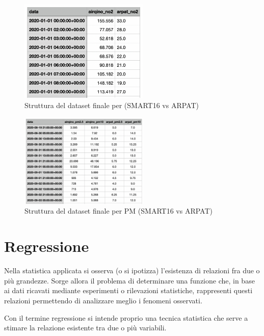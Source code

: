 \begin{figure}[H]
\centering
\captionsetup{justification=centering}
\includegraphics[width=0.55\textwidth,height=\textheight,keepaspectratio]{img/no2_ds_final}
\caption{Struttura del dataset finale per  (SMART16 vs ARPAT)}
\label{fig:no2-ds-final}
\end{figure}

\begin{figure}[H]
\centering
\captionsetup{justification=centering}
\includegraphics[width=0.55\textwidth,height=\textheight,keepaspectratio]{img/pm_ds_final}
\caption{Struttura del dataset finale per PM (SMART16 vs ARPAT)}
\label{fig:pm-ds-final}
\end{figure}

\section{Regressione}\label{sec:regressione}
Nella statistica applicata si osserva (o si ipotizza) l’esistenza di relazioni fra due o più grandezze. Sorge allora il problema di determinare una funzione che, in base ai dati ricavati mediante esperimenti o rilevazioni statistiche, rappresenti questi relazioni permettendo di analizzare meglio i fenomeni osservati. 

Con il termine regressione si intende proprio una tecnica statistica che serve a stimare la relazione esistente tra due o più variabili.

